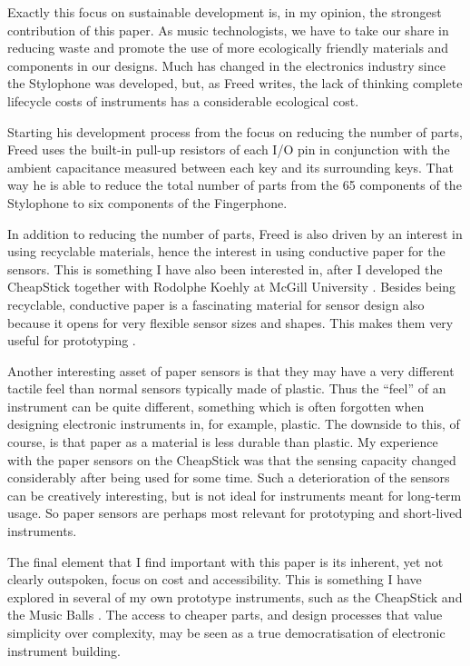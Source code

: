 Exactly this focus on sustainable development is, in my opinion, the strongest contribution of this paper. As music technologists, we have to take our share in reducing waste and promote the use of more ecologically friendly materials and components in our designs. Much has changed in the electronics industry since the Stylophone was developed, but, as Freed writes, the lack of thinking complete lifecycle costs of instruments has a considerable ecological cost. 

Starting his development process from the focus on reducing the number of parts, Freed uses the built-in pull-up resistors of each I/O pin in conjunction with the ambient capacitance measured between each key and its surrounding keys. That way he is able to reduce the total number of parts from the 65 components of the Stylophone to six components of the Fingerphone. 

In addition to reducing the number of parts, Freed is also driven by an interest in using recyclable materials, hence the interest in using conductive paper for the sensors. This is something I have also been interested in, after I developed the CheapStick together with Rodolphe Koehly at McGill University \cite{Jensenius:2005}. Besides being recyclable, conductive paper is a fascinating material for sensor design also because it opens for very flexible sensor sizes and shapes. This makes them very useful for prototyping \cite{Koehly:2014}. 

Another interesting asset of paper sensors is that they may have a very different tactile feel than normal sensors typically made of plastic. Thus the ``feel'' of an instrument can be quite different, something which is often forgotten when designing electronic instruments in, for example, plastic. The downside to this, of course, is that paper as a material is less durable than plastic. My experience with the paper sensors on the CheapStick was that the sensing capacity changed considerably after being used for some time. Such a deterioration of the sensors can be creatively interesting, but is not ideal for instruments meant for long-term usage. So paper sensors are perhaps most relevant for prototyping and short-lived instruments.

The final element that I find important with this paper is its inherent, yet not clearly outspoken, focus on cost and accessibility. This is something I have explored in several of my own prototype instruments, such as the CheapStick and the Music Balls \cite{Jensenius:2012}. The access to cheaper parts, and design processes that value simplicity over complexity, may be seen as a true democratisation of electronic instrument building. 